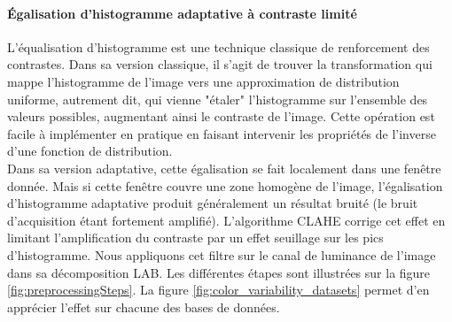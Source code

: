 \paragraph{Égalisation d'histogramme adaptative à contraste limité}
L'équalisation d'histogramme est une technique classique de renforcement des contrastes. Dans sa version classique, il s'agit de trouver la transformation qui mappe l'histogramme de l'image vers une approximation de distribution uniforme, autrement dit, qui vienne "étaler" l'histogramme sur l'ensemble des valeurs possibles, augmentant ainsi le contraste de l'image. Cette opération est facile à implémenter en pratique en faisant intervenir les propriétés de l'inverse d'une fonction de distribution. \\ 
Dans sa version adaptative, cette égalisation se fait localement dans une fenêtre donnée. Mais si cette fenêtre couvre une zone homogène de l'image, l'égalisation d'histogramme adaptative produit généralement un résultat bruité (le bruit d'acquisition étant fortement amplifié). L'algorithme \ac{CLAHE} corrige cet effet en limitant l'amplification du contraste par un effet seuillage sur les pics d'histogramme. Nous appliquons cet filtre sur le canal de luminance de l'image dans sa décomposition LAB.
\newline
Les différentes étapes sont illustrées sur la figure \ref{fig:preprocessingSteps}. La figure \ref{fig:color_variability_datasets} permet d'en apprécier l'effet sur chacune des bases de données.

